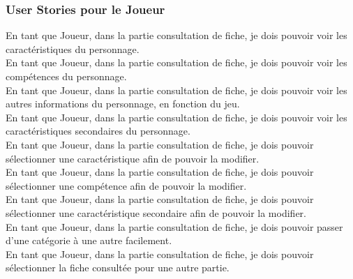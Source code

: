 \subsubsection{User Stories pour le Joueur}

En tant que Joueur, dans la partie consultation de fiche, je dois pouvoir voir
les caractéristiques du personnage.\\

En tant que Joueur, dans la partie consultation de fiche, je dois pouvoir voir
les compétences du personnage.\\

En tant que Joueur, dans la partie consultation de fiche, je dois pouvoir voir
les autres informations du personnage, en fonction du jeu.\\

En tant que Joueur, dans la partie consultation de fiche, je dois pouvoir voir
les caractéristiques secondaires du personnage.\\

En tant que Joueur, dans la partie consultation de fiche, je dois pouvoir
sélectionner une caractéristique afin de pouvoir la modifier.\\

En tant que Joueur, dans la partie consultation de fiche, je dois pouvoir
sélectionner une compétence afin de pouvoir la modifier.\\

En tant que Joueur, dans la partie consultation de fiche, je dois pouvoir
sélectionner une caractéristique secondaire afin de pouvoir la modifier.\\

En tant que Joueur, dans la partie consultation de fiche, je dois pouvoir
passer d'une catégorie à une autre facilement.\\

En tant que Joueur, dans la partie consultation de fiche, je dois pouvoir
sélectionner la fiche consultée pour une autre partie.\\
